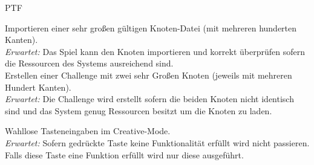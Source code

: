	\begin{ids}{\gls{PTF}}
	
		\id[1000] Importieren einer sehr großen gültigen Knoten-Datei (mit mehreren hunderten Kanten).\\
		
		\textit{Erwartet:} Das Spiel kann den Knoten importieren und korrekt überprüfen sofern die Ressourcen des Systems ausreichend sind.\\
		
		\id[1010] Erstellen einer Challenge mit zwei sehr Großen Knoten (jeweils mit mehreren Hundert Kanten).\\
		
		\textit{Erwartet:} Die Challenge wird erstellt sofern die beiden Knoten nicht identisch sind und das System genug Ressourcen besitzt um die Knoten zu laden.
		
		\id[1020] Wahllose Tasteneingaben im Creative-Mode.\\
		
		\textit{Erwartet:} Sofern gedrückte Taste keine Funktionalität erfüllt wird nicht passieren. Falls diese Taste eine Funktion erfüllt wird nur diese ausgeführt.
	
	\end{ids}


